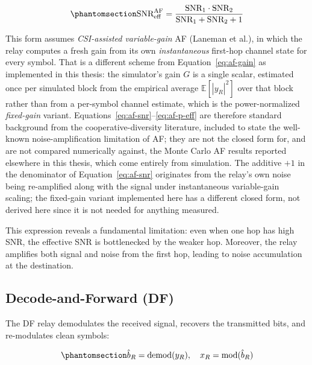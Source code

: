 \begin{equation}\protect\phantomsection\label{eq:af-snr}{\text{SNR}_{\text{eff}}^{\text{AF}} = \frac{\text{SNR}_1 \cdot \text{SNR}_2}{\text{SNR}_1 + \text{SNR}_2 + 1}
}\end{equation}

This form assumes \emph{CSI-assisted variable-gain} AF (Laneman et al.), in which the relay computes a fresh gain from its own \emph{instantaneous} first-hop channel state for every symbol. That is a different scheme from Equation~\ref{eq:af-gain} as implemented in this thesis: the simulator's gain $G$ is a single scalar, estimated once per simulated block from the empirical average $\mathbb{E}[|y_R|^2]$ over that block rather than from a per-symbol channel estimate, which is the power-normalized \emph{fixed-gain} variant. Equations~\ref{eq:af-snr}--\ref{eq:af-p-eff} are therefore standard background from the cooperative-diversity literature, included to state the well-known noise-amplification limitation of AF; they are not the closed form for, and are not compared numerically against, the Monte Carlo AF results reported elsewhere in this thesis, which come entirely from simulation. The additive $+1$ in the denominator of Equation~\ref{eq:af-snr} originates from the relay's own noise being re-amplified along with the signal under instantaneous variable-gain scaling; the fixed-gain variant implemented here has a different closed form, not derived here since it is not needed for anything measured.

This expression reveals a fundamental limitation: even when one hop has high SNR, the effective SNR is bottlenecked by the weaker hop. Moreover, the relay amplifies both signal and noise from the first hop, leading to noise accumulation at the destination.

\subsection{Decode-and-Forward (DF)}\label{sec:classical-relay-strategies-df}
The DF relay demodulates the received signal, recovers the transmitted bits, and re-modulates clean symbols:

\begin{equation}\protect\phantomsection\label{eq:df-demod-remod}{\hat{b}_R = \text{demod}(y_R), \quad x_R = \text{mod}(\hat{b}_R)
}\end{equation}

